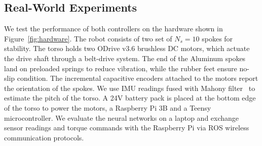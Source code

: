 \subsection{Real-World Experiments}

%
We test the performance of both controllers on the hardware shown in
Figure~\ref{fig:hardware}.
%
The robot consists of two set of $N_s=10$ spokes for stability.
%
The torso holds two ODrive v3.6 brushless DC motors, which actuate the drive
shaft through a belt-drive system.
%
The end of the Aluminum spokes land on preloaded springs to reduce vibration,
while the rubber feet ensure no-slip condition.
%
The incremental capacitive encoders attached to the motors report the
orientation of the spokes.
%
We use IMU readings fused with Mahony filter~\cite{mahony2008nonlinear} to estimate
the pitch of the torso.
%
A 24V battery pack is placed at the bottom edge of the torso to power
the motors, a Raspberry Pi 3B and a Teensy microcontroller.
%
We evaluate the neural networks on a laptop and exchange sensor readings and
torque commands with the Raspberry Pi via ROS wireless communication protocols.

